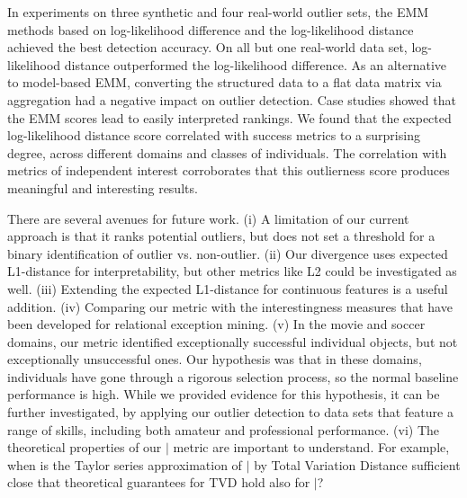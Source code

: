 {In experiments on three synthetic and four real-world outlier sets, the EMM methods based on log-likelihood difference and the log-likelihood distance achieved the best detection accuracy. On all but one real-world data set, log-likelihood distance outperformed the log-likelihood difference. As an alternative to model-based EMM, converting the structured data to a flat data matrix via aggregation had a negative impact on outlier detection. 
Case studies showed that the EMM scores lead to easily interpreted rankings. We found that the expected log-likelihood distance score correlated with success metrics to a surprising degree, across different domains and classes of individuals. The correlation with metrics of independent interest corroborates that this outlierness score produces meaningful and interesting results.
%

 							
There are several avenues for future work.  (i) A limitation of our current approach is that it ranks potential outliers, but does not set a threshold for a binary identification of outlier vs. non-outlier. (ii) Our divergence uses expected L1-distance for interpretability, but other metrics like L2 could be investigated as well. (iii) Extending the expected L1-distance for continuous features is a useful addition. (iv) Comparing our metric with the interestingness measures that have been developed for relational exception mining. (v) In the movie and soccer domains, our metric identified exceptionally successful individual objects, but not exceptionally unsuccessful ones. Our hypothesis was that in these domains, individuals have gone through a rigorous selection process, so the normal baseline performance is high. While we provided evidence for this hypothesis, it can be further investigated,  by applying our outlier detection to data sets that feature a range of skills, including both amateur and professional performance. (vi) The theoretical properties of our $\mid$ metric are important to understand. For example, when is the Taylor series approximation of $\mid$ by Total Variation Distance sufficient close that theoretical guarantees for TVD hold also for $\mid$?
								
}
